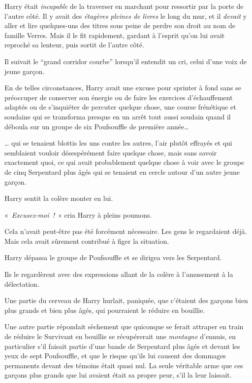 Harry était \emph{incapable} de la traverser en marchant pour ressortir par la porte de l'autre côté.
Il y avait des \emph{étagères pleines de livres} le long du mur, et il \emph{devait} y aller et lire quelques-uns des titres sous peine de perdre son droit au nom de famille Verres.
Mais il le fit rapidement, gardant à l'esprit qu'on lui avait reproché sa lenteur, puis sortit de l'autre côté.

Il suivait le “grand corridor courbe” lorsqu'il entendit un cri, celui d'une voix de jeune garçon.

En de telles circonstances, Harry avait une excuse pour sprinter à fond sans se préoccuper de conserver son énergie ou de faire les exercices d'échauffement adaptés ou de s'inquiéter de percuter quelque chose, une course frénétique et soudaine qui se transforma presque en un arrêt tout aussi soudain quand il déboula sur un groupe de six Poufsouffle de première année…

… qui se tenaient blottis les uns contre les autres, l'air plutôt effrayés et qui semblaient vouloir désespérément faire quelque chose, mais sans savoir exactement quoi, ce qui avait probablement quelque chose à voir avec le groupe de cinq Serpentard plus âgés qui se tenaient en cercle autour d'un autre jeune garçon.

Harry sentit la colère monter en lui.

«~\emph{Excusez-moi~!}~» cria Harry à pleins poumons.

Cela n'avait peut-être pas été forcément nécessaire.
Les gens le regardaient déjà. Mais cela avait sûrement contribué à figer la situation.

Harry dépassa le groupe de Poufsouffle et se dirigea vers les Serpentard.

Ils le regardèrent avec des expressions allant de la colère à l'amusement à la délectation.

Une partie du cerveau de Harry hurlait, paniquée, que c'étaient des garçons bien plus grands et bien plus âgés, qui pourraient le réduire en bouillie.

Une autre partie répondait sèchement que quiconque se ferait attraper en train de réduire le Survivant en bouillie se récupérerait une \emph{montagne} d'ennuis, en particulier s'il faisait partie d'une bande de Serpentard plus âgés et devant les yeux de sept Poufsouffle, et que le risque qu'ils lui causent des dommages permanents devant des témoins était quasi nul.
La seule véritable arme que ces garçons plus grands que lui avaient était sa propre peur, s'il la leur laissait.

